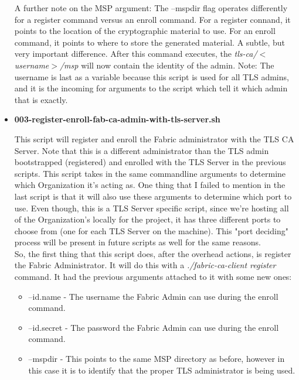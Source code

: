 \begin{itemize}
					\hspace{10mm}A further note on the MSP argument: The --mspdir flag operates differently for a register command versus an enroll command. For a register connand, it points to the location of the cryptographic material to use. For an enroll command, it points to where to store the generated material. A subtle, but very important difference. After this command executes, the \textit{tls-ca/$<$username$>$/msp} will now contain the identity of the admin. Note: The username is last as a variable because this script is used for all TLS admins, and it is the incoming for arguments to the script which tell it which admin that is exactly.
					
				\item \textbf{003-register-enroll-fab-ca-admin-with-tls-server.sh}
					
					\hspace{10mm}This script will register and enroll the Fabric administrator with the TLS CA Server. Note that this is a different administrator than the TLS admin bootstrapped (registered) and enrolled with the TLS Server in the previous scripts. This script takes in the same commandline arguments to determine which Organization it's acting as. One thing that I failed to mention in the last script is that it will also use these arguments to determine which port to use. Even though, this is a TLS Server specific script, since we're hosting all of the Organization's locally for the project, it has three different ports to choose from (one for each TLS Server on the machine). This "port deciding" process will be present in future scripts as well for the same reasons.\\
					
					\hspace{10mm}So, the first thing that this script does, after the overhead actions, is register the Fabric Administrator. It will do this with a \textit{./fabric-ca-client register} command. It had the previous arguments attached to it with some new ones:
						\begin{itemize}
							\item --id.name - The username the Fabric Admin can use during the enroll command.
							\item --id.secret - The password the Fabric Admin can use during the enroll command.
							\item --mspdir - This points to the same MSP directory as before, however in this case it is to identify that the proper TLS administrator is being used.
						\end{itemize}
						

\end{itemize}

